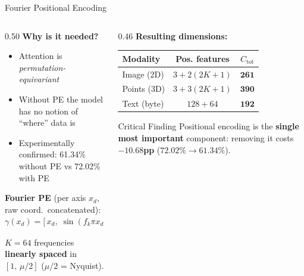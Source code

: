 \documentclass[aspectratio=169,11pt]{beamer}
\begin{document}
\begin{frame}[shrink=5]{Fourier Positional Encoding}
  \begin{columns}[T]
    \begin{column}{0.50\textwidth}
      \textbf{Why is it needed?}
      \begin{itemize}
        \item Attention is \textit{permutation-equivariant}
        \item Without PE the model has no notion of ``where'' data is
        \item Experimentally confirmed: \alert{61.34\% without PE} vs 72.02\% with PE
      \end{itemize}

      \vspace{0.5em}
      \textbf{Fourier PE} (per axis $x_d$, raw coord.\ concatenated):
      \[
      \gamma(x_d) = \bigl[\,x_d,\; \sin(f_k \pi x_d),\, \cos(f_k \pi x_d)\,\bigr]_{k=1}^{K}
      \]

      $K=64$ frequencies \textbf{linearly spaced} in $[1,\, \mu/2]$ ($\mu/2$ = Nyquist).
    \end{column}
    \begin{column}{0.46\textwidth}
      \textbf{Resulting dimensions:}

      \vspace{0.5em}
      \begin{table}
        \centering\small
        \begin{tabular}{lcc}
          \toprule
          \textbf{Modality} & \textbf{Pos. features} & \textbf{$C_{\text{tot}}$} \\
          \midrule
          Image (2D) & $3 + 2(2K{+}1)$ & $\mathbf{261}$ \\
          Points (3D) & $3 + 3(2K{+}1)$ & $\mathbf{390}$ \\
          Text (byte) & $128 + 64$ & $\mathbf{192}$ \\
          \bottomrule
        \end{tabular}
      \end{table}

      \vspace{0.5em}
      \begin{alertblock}{Critical Finding}
        Positional encoding is the \textbf{single most important} component: removing it costs \textbf{$-10.68$pp} ($72.02\% \to 61.34\%$).
      \end{alertblock}
    \end{column}
  \end{columns}
\end{frame}
\end{document}
